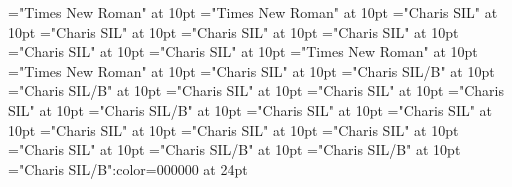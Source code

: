 \documentclass[a4paper,twoside]{article}
\begin{document}
\font\xitempttranslationLcpttranslationsexamplessensesensesentryletDatadicBody="Times New Roman" at 10pt
\font\spanptxitempttranslationLcpttranslationsexamplessensesensesentryletDatadicBody="Times New Roman" at 10pt
\font\spanentranslationLcpttranslationsexamplessensesensesentryletDatadicBody="Charis SIL" at 10pt
\font\xitementranslationLcpttranslationsexamplessensesensesentryletDatadicBody="Charis SIL" at 10pt
\font\spanenxitementranslationLcpttranslationsexamplessensesensesentryletDatadicBody="Charis SIL" at 10pt
\font\complexformrefsentryletDatadicBody="Charis SIL" at 10pt
\font\complexformrefsafterentryletDatadicBody="Charis SIL" at 10pt
\font\complexformtypecomplexformrefsentryletDatadicBody="Charis SIL" at 10pt
\font\LexEntryTypepublishStemComplexFormTypeReverseAbbrPubptcomplexformtypecomplexformrefsentryletDatadicBody="Times New Roman" at 10pt
\font\spanptLexEntryTypepublishStemComplexFormTypeReverseAbbrPubptcomplexformtypecomplexformrefsentryletDatadicBody="Times New Roman" at 10pt
\font\spanencomplexformtypecomplexformrefsentryletDatadicBody="Charis SIL" at 10pt
\font\complexformformsehcomplexformrefsentryletDatadicBody="Charis SIL/B" at 10pt
\font\spanencomplexformformsehcomplexformrefsentryletDatadicBody="Charis SIL/B" at 10pt
\font\spanencomplexformrefsentryletDatadicBody="Charis SIL" at 10pt
\font\xitementryrefcomponentprimaryrefsentryletDatadicBody="Charis SIL" at 10pt
\font\axitementryrefcomponentprimaryrefsentryletDatadicBody="Charis SIL" at 10pt
\font\LexEntrypublishStemComponentTargetHeadWordRefsehaxitementryrefcomponentprimaryrefsentryletDatadicBody="Charis SIL/B" at 10pt
\font\spanenentryrefcomponentprimaryrefsentryletDatadicBody="Charis SIL" at 10pt
\font\translationLcentranslationsexamplessensesensesentryletDatadicBody="Charis SIL" at 10pt
\font\spanentranslationLcentranslationsexamplessensesensesentryletDatadicBody="Charis SIL" at 10pt
\font\xitemrelationssensesensesentryletDatadicBody="Charis SIL" at 10pt
\font\lexreftargetsxitemrelationssensesensesentryletDatadicBody="Charis SIL" at 10pt
\font\alexreftargetsxitemrelationssensesensesentryletDatadicBody="Charis SIL" at 10pt
\font\sensecrossrefsehalexreftargetsxitemrelationssensesensesentryletDatadicBody="Charis SIL/B" at 10pt
\font\xsensexrefnumbersensecrossrefsehalexreftargetsxitemrelationssensesensesentryletDatadicBody="Charis SIL/B" at 10pt
\color{black} 
\thispagestyle{empty} 
\font\CoverPageTitle="Charis SIL/B":color=000000 at 24pt 
\vskip 60pt 
\end{document}
